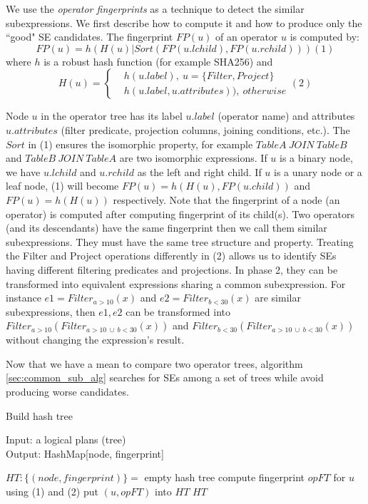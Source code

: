 We use the \emph{operator fingerprints} as a technique to detect the similar subexpressions. We first describe how to compute it and how to produce only the ``good" SE candidates. The fingerprint $FP(u)$ of an operator $u$ is computed by:
\[FP(u)= h(H(u) | Sort(FP(u.lchild), FP(u.rchild))) (1)\]
where $h$ is a robust hash function (for example SHA256) and 
\[H(u)=
\begin{cases}
 & h(u.label),\ u= \{Filter, Project\}\\ 
 & h(u.label, u.attributes)),\ otherwise
\end{cases} (2)\]

Node $u$ in the operator tree has its label $u.label$ (operator name) and attributes $u.attributes$ (filter predicate, projection columns, joining conditions, etc.). The $Sort$ in (1) ensures the isomorphic property, for example $TableA\ JOIN\ TableB$ and $TableB\ JOIN\ TableA$ are two isomorphic expressions. If $u$ is a binary node, we have $u.lchild$ and $u.rchild$ as the left and right child. If $u$ is a unary node or a leaf node, (1) will become $FP(u)= h(H(u), FP(u.child))$ and $FP(u)= h(H(u))$ respectively. Note that the fingerprint of a node (an operator) is computed after computing fingerprint of its child(s). Two operators (and its descendants) have the same fingerprint then we call them similar subexpressions. They must have the same tree structure and property. Treating the Filter and Project operations differently in (2) allows us to identify SEs having different filtering predicates and projections. In phase 2, they can be transformed into equivalent expressions sharing a common subexpression. For instance $e1 = Filter_{a>10}(x)$ and $e2 = Filter_{b<30}(x)$ are similar subexpressions, then $e1, e2$ can be transformed into $Filter_{a>10}(Filter_{a>10\ \cup \ b < 30}(x))$ and $Filter_{b<30}(Filter_{a>10\ \cup \ b < 30}(x))$ without changing the expression's result.

Now that we have a mean to compare two operator trees, algorithm \ref{sec:common_sub_alg} searches for SEs among a set of trees while avoid producing worse candidates.

\begin{algorithm}
	\caption{Build hash tree}\label{sec:buildht_alg}
	Input: a logical plans (tree)\\
	Output: HashMap[node, fingerprint]
	\begin{algorithmic}[1]
		\State $HT:\{(node, fingerprint)\}=$ empty hash tree
			\State compute fingerprint $opFT$ for $u$ using (1) and (2)
			\State put $(u, opFT)$ into $HT$
		\EndFor
		\State \Return  $HT$
		\EndProcedure
	\end{algorithmic}
\end{algorithm}

